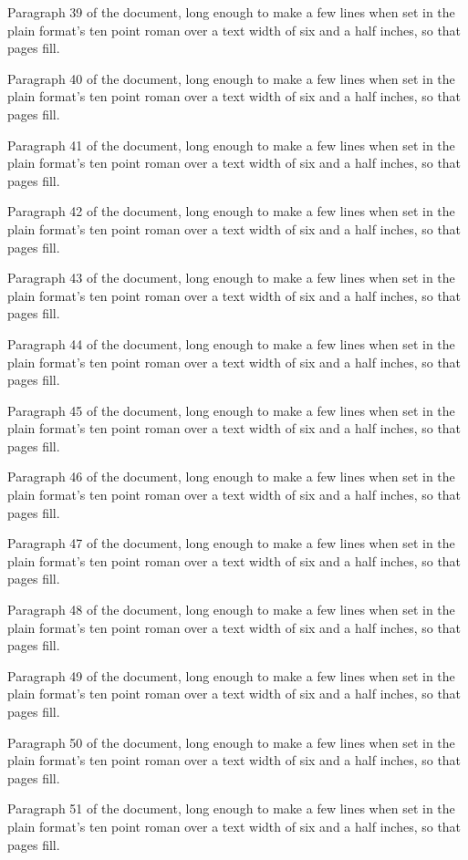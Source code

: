 Paragraph 39 of the document, long enough to make a few lines when set in the plain format's ten point roman over a text width of six and a half inches, so that pages fill.

Paragraph 40 of the document, long enough to make a few lines when set in the plain format's ten point roman over a text width of six and a half inches, so that pages fill.

Paragraph 41 of the document, long enough to make a few lines when set in the plain format's ten point roman over a text width of six and a half inches, so that pages fill.

Paragraph 42 of the document, long enough to make a few lines when set in the plain format's ten point roman over a text width of six and a half inches, so that pages fill.

Paragraph 43 of the document, long enough to make a few lines when set in the plain format's ten point roman over a text width of six and a half inches, so that pages fill.

Paragraph 44 of the document, long enough to make a few lines when set in the plain format's ten point roman over a text width of six and a half inches, so that pages fill.

Paragraph 45 of the document, long enough to make a few lines when set in the plain format's ten point roman over a text width of six and a half inches, so that pages fill.

Paragraph 46 of the document, long enough to make a few lines when set in the plain format's ten point roman over a text width of six and a half inches, so that pages fill.

Paragraph 47 of the document, long enough to make a few lines when set in the plain format's ten point roman over a text width of six and a half inches, so that pages fill.

Paragraph 48 of the document, long enough to make a few lines when set in the plain format's ten point roman over a text width of six and a half inches, so that pages fill.

Paragraph 49 of the document, long enough to make a few lines when set in the plain format's ten point roman over a text width of six and a half inches, so that pages fill.

Paragraph 50 of the document, long enough to make a few lines when set in the plain format's ten point roman over a text width of six and a half inches, so that pages fill.

Paragraph 51 of the document, long enough to make a few lines when set in the plain format's ten point roman over a text width of six and a half inches, so that pages fill.


